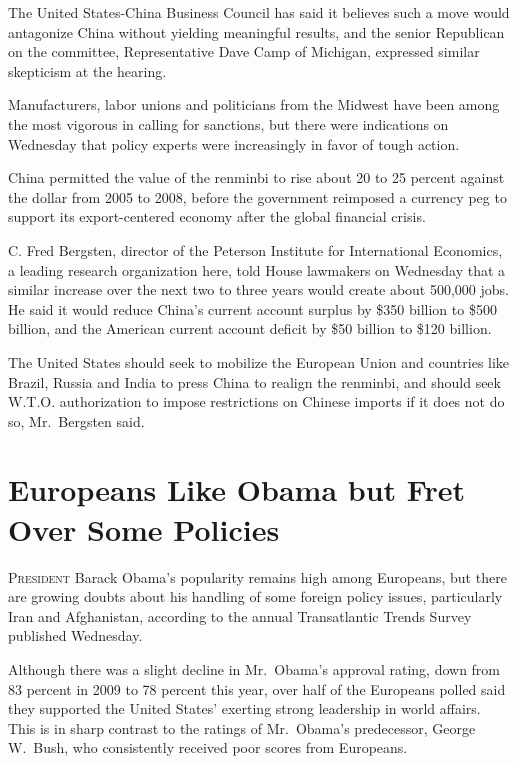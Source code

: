 ﻿\documentclass[12pt]{article}
\begin{document}
The United States-China Business Council has said it believes such a move would antagonize China
without yielding meaningful results, and the senior Republican on the committee, Representative Dave
Camp of Michigan, expressed similar skepticism at the hearing.

Manufacturers, labor unions and politicians from the Midwest have been among the most vigorous in
calling for sanctions, but there were indications on Wednesday that policy experts were increasingly
in favor of tough action.

China permitted the value of the renminbi to rise about 20 to 25 percent against the dollar from
2005 to 2008, before the government reimposed a currency peg to support its export-centered economy
after the global financial crisis.

C. Fred Bergsten, director of the Peterson Institute for International Economics, a leading research
organization here, told House lawmakers on Wednesday that a similar increase over the next two to
three years would create about 500,000 jobs. He said it would reduce China's current account surplus
by \$350 billion to \$500 billion, and the American current account deficit by \$50 billion to \$120
billion.

The United States should seek to mobilize the European Union and countries like Brazil, Russia and
India to press China to realign the renminbi, and should seek W.T.O. authorization to impose
restrictions on Chinese imports if it does not do so, Mr.~Bergsten said.

\pagebreak
\section{Europeans Like Obama but Fret Over Some Policies}

\lettrine{P}{resident} Barack Obama's popularity remains high among
Europeans, but there are growing doubts about his handling of some foreign policy issues,
particularly Iran and Afghanistan, according to the annual Transatlantic Trends Survey published
Wednesday.

Although there was a slight decline in Mr.~Obama's approval rating, down from 83 percent in 2009 to
78 percent this year, over half of the Europeans polled said they supported the United States'
exerting strong leadership in world affairs. This is in sharp contrast to the ratings of Mr.~Obama's
predecessor, George W.~Bush, who consistently received poor scores from Europeans.
\end{document}
